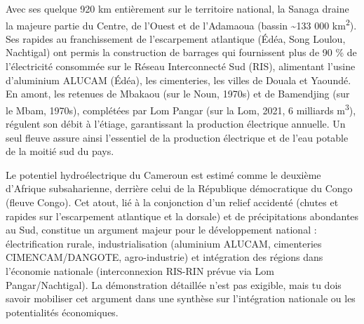 \documentclass[11pt]{article}
\begin{document}
\begin{exemplebox}
Avec ses quelque 920 km entièrement sur le territoire national, la Sanaga draine la majeure partie du Centre, de l'Ouest et de l'Adamaoua (bassin \textasciitilde 133 000 km\textsuperscript{2}). Ses rapides au franchissement de l'escarpement atlantique (Édéa, Song Loulou, Nachtigal) ont permis la construction de barrages qui fournissent plus de 90 \% de l'électricité consommée sur le Réseau Interconnecté Sud (RIS), alimentant l'usine d'aluminium ALUCAM (Édéa), les cimenteries, les villes de Douala et Yaoundé. En amont, les retenues de Mbakaou (sur le Noun, 1970s) et de Bamendjing (sur le Mbam, 1970s), complétées par Lom Pangar (sur la Lom, 2021, 6 milliards m\textsuperscript{3}), régulent son débit à l'étiage, garantissant la production électrique annuelle. Un seul fleuve assure ainsi l'essentiel de la production électrique et de l'eau potable de la moitié sud du pays.
\end{exemplebox}

\begin{propriete}
Le potentiel hydroélectrique du Cameroun est estimé comme le deuxième d'Afrique subsaharienne, derrière celui de la République démocratique du Congo (fleuve Congo). Cet atout, lié à la conjonction d'un relief accidenté (chutes et rapides sur l'escarpement atlantique et la dorsale) et de précipitations abondantes au Sud, constitue un argument majeur pour le développement national : électrification rurale, industrialisation (aluminium ALUCAM, cimenteries CIMENCAM/DANGOTE, agro-industrie) et intégration des régions dans l'économie nationale (interconnexion RIS-RIN prévue via Lom Pangar/Nachtigal). La démonstration détaillée n'est pas exigible, mais tu dois savoir mobiliser cet argument dans une synthèse sur l'intégration nationale ou les potentialités économiques.
\end{propriete}
\end{document}
